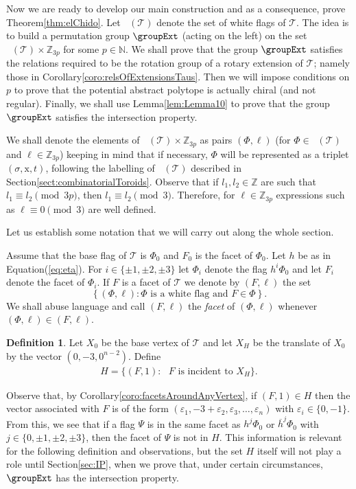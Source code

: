\documentclass[final]{amsart}
\theoremstyle{plain}
\theoremstyle{definition}
\newtheorem{defn}[thm]{Definition}
\theoremstyle{remark}
\numberwithin{equation}{section}
\renewcommand{\epsilon}{\varepsilon} \renewcommand{\subset}{\subseteq} \renewcommand{\supset}{\supseteq} \renewcommand{\subsetneq}{\varsubsetneq}
\renewcommand{\{}{\lbrace}
\renewcommand{\}}{\rbrace}
\renewcommand{\bar}{\overline}
\newcommand{\bN}{\mathbb{N}}
\newcommand{\bZ}{\mathbb{Z}}
\newcommand{\cT}{\mathcal{T}}
\newcommand{\cyvec}[1]{{\mathrm{#1}}}
\newcommand{\vx}{\cyvec{x}}
\DeclareMathOperator{\Fw}{\mathcal{F}^{w}}
\newcommand{\kng}{{h}}
\newcommand{\etab}{\bar{\kng}}
\begin{document}
Now we are ready to develop our main construction and as a consequence, prove Theorem\nobreakspace \ref {thm:elChido}.
Let $\Fw(\cT)$ denote the set of white flags of $\cT$.
The idea is to build a permutation group $\groupExt$ (acting on the left) on the set $\Fw(\cT) \times \bZ_{3 p}$ for some $p \in \bN$.
We shall prove that the group $\groupExt$ satisfies the relations required to be the rotation group of a rotary extension of $\cT$;
namely those in Corollary\nobreakspace \ref {coro:relsOfExtensionsTaus}.
Then we will impose conditions on $p$ to prove that the potential abstract polytope is actually chiral (and not regular).
Finally, we shall use Lemma\nobreakspace \ref {lem:Lemma10} to prove that the group $\groupExt$ satisfies the intersection property.

We shall denote the elements of $\Fw(\cT) \times \bZ_{3p}$  as pairs $(\Phi,\ell)$ (for $\Phi \in \Fw(\cT)$ and $\ell \in \bZ_{3p}$) keeping in mind that if necessary, $\Phi$ will be represented as a triplet $(\sigma, \vx, t)$, following the labelling of $\Fw(\cT)$ described in Section\nobreakspace \ref {sect:combinatorialToroids}.
Observe that if $l_{1}, l_{2} \in \bZ$ are such that $l_{1}\equiv l_{2} \pmod{3p}$, then $l_{1} \equiv l_{2} \pmod{3}$. Therefore, for $\ell \in \bZ_{3p}$ expressions such as $\ell \equiv 0 \pmod{3}$ are well defined.

Let us establish some notation that we will carry out along the whole section.

Assume that the base flag of $\cT$ is $\Phi_{0}$ and $F_{0}$ is the facet of $\Phi_{0}$.
Let $\kng$ be as in Equation\nobreakspace \textup {(\ref {eq:eta})}.
For $i \in \{\pm 1, \pm 2, \pm 3\}$ let $\Phi_i$ denote the flag $\kng^{i}\Phi_{0}$ and let $F_{i} $ denote the facet of $\Phi_i$.
If $F$ is a facet of $\cT$ we denote by $(F,\ell)$ the set \[\left\{ (\Phi,\ell) : \Phi \text{ is a white flag  and }F \in \Phi \right\}.   \] 
We shall abuse language and call $(F,\ell)$ the \emph{facet} of $(\Phi,\ell)$ whenever $(\Phi,\ell) \in (F,\ell)$.

\begin{defn}\label{defn:hoyo}
Let $X_0$ be the base vertex of $\cT$ and let $X_H$ be the translate of $X_0$ by the vector $(0,-3,0^{n-2})$. Define 
\begin{align*}
H = \{(F,1) : \text{ $F$ is incident to $X_H$} \}.
\end{align*}
\end{defn}

Observe that, by Corollary\nobreakspace \ref {coro:facetsAroundAnyVertex},  if $(F,1) \in H$ then the vector associated with $F$  is of the form $(\epsilon_1,-3 +\epsilon_2, \epsilon_3, \ldots,\epsilon_{n})$ with $\epsilon_i \in \{0,-1\}$. 
From this, we see that if a flag $\Psi$ is in the same facet as $\kng^j\Phi_0$ or $\etab^j\Phi_0$ with $j \in \{0, \pm 1,\pm 2, \pm 3\}$, then the facet of $\Psi$ is not in $H$. This information is relevant for the following definition and observations, but the set $H$ itself will not play a role until Section\nobreakspace \ref {sec:IP}, when we prove that, under certain circumstances, $\groupExt$  has the intersection property.
\end{document}

